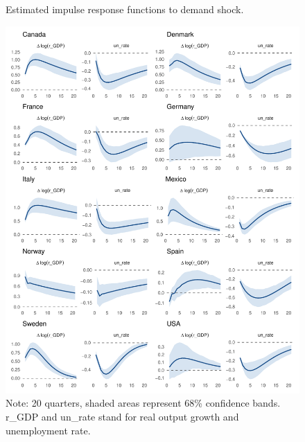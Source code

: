 \documentclass[12pt, a4paper]{article}
\begin{document}
\newpage
\begin{figure}[H]
    \caption{Estimated impulse response functions to demand shock.}
    \label{fig:var_impulses_demand}
    \centering
    \includegraphics[width=\textwidth, height=0.9\textheight, keepaspectratio]{Figures/all_demand.pdf}
    \caption*{Note: 20 quarters, shaded areas represent 68\% confidence bands. r\_GDP and un\_rate stand for real output growth and unemployment rate.}
\end{figure}
\end{document}
